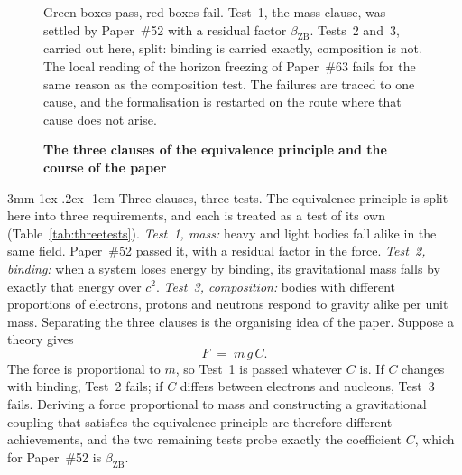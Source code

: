 \documentclass[%
 reprint, amsmath,amssymb, aps, prb, ]{revtex4-2}
\makeatletter
\numberwithin{equation}{section}
\renewcommand\paragraph{%
  \@startsection{paragraph}{4}{\z@}%
    {3mm \@plus 1ex \@minus .2ex}%
    {-1em}%
    {\normalfont\normalsize\itshape}}
\newcommand{\betaZB}{\beta_{\text{ZB}}}
\makeatother
\begin{document}
\begin{figure}[t!]
\begin{tikzpicture}[node distance=4mm and 6mm]
\end{tikzpicture}
\caption{\textbf{The three clauses of the equivalence principle and the course of the paper}}
\label{fig:roadmap}
\vspace{0.4em}
\begin{minipage}{0.95\textwidth}
\justifying\small
Green boxes pass, red boxes fail. Test~1, the mass clause, was settled by Paper~\#52 with a residual factor $\betaZB$. Tests~2 and~3, carried out here, split: binding is carried exactly, composition is not. The local reading of the horizon freezing of Paper~\#63 fails for the same reason as the composition test. The failures are traced to one cause, and the formalisation is restarted on the route where that cause does not arise.
\end{minipage}
\end{figure}

\paragraph{Three clauses, three tests.} The equivalence principle is split here into three requirements, and each is treated as a test of its own (Table~\ref{tab:threetests}). \emph{Test~1, mass:} heavy and light bodies fall alike in the same field. Paper~\#52 passed it, with a residual factor in the force. \emph{Test~2, binding:} when a system loses energy by binding, its gravitational mass falls by exactly that energy over $c^{2}$. \emph{Test~3, composition:} bodies with different proportions of electrons, protons and neutrons respond to gravity alike per unit mass. Separating the three clauses is the organising idea of the paper. Suppose a theory gives
\begin{equation}
F \;=\; m\,g\,C .
\label{eq:FmgC}
\end{equation}
The force is proportional to $m$, so Test~1 is passed whatever $C$ is. If $C$ changes with binding, Test~2 fails; if $C$ differs between electrons and nucleons, Test~3 fails. Deriving a force proportional to mass and constructing a gravitational coupling that satisfies the equivalence principle are therefore different achievements, and the two remaining tests probe exactly the coefficient $C$, which for Paper~\#52 is $\betaZB$.
\end{document}
